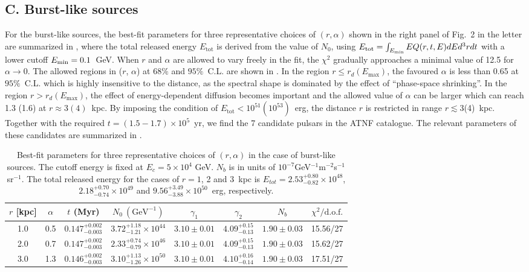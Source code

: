 \subsection{C. Burst-like sources}
For the burst-like sources, 
the best-fit parameters for three representative choices  of 
$(r, \alpha)$ shown in the right panel of Fig.~2 in the letter  %
are summarized  in  ,
where the total released energy $E_{\text{tot}}$ is derived from the value of $N_{0}$,
using
$E_{\text{tot}}=\int_{E_{\text{min}}} E Q(r,t,E) dE d^{3}r dt$ with a lower cutoff $E_{\text{min}}=0.1$~GeV.
When $r$ and $\alpha$ are allowed to vary freely in the fit, 
the $\chi^{2}$ gradually approaches a minimal value  of  12.5 for $\alpha\to 0$.
The allowed regions in ($r$, $\alpha$) at $68\%$ and $95\%$~C.L.
are shown in  .
In the region $r \leq r_{d}(E_{\text{max}})$, 
the favoured $\alpha$ is less than 0.65 at $95\%$~C.L. which is highly 
insensitive to the distance, as the spectral shape is dominated by the effect
of ``phase-space shrinking''. 
In the region $r > r_{d}(E_{\text{max}})$, the effect of energy-dependent diffusion
becomes important and the allowed value of $\alpha$ can be larger which can reach 
1.3 (1.6) at $r\approx 3 (4)$~kpc.
By imposing the condition of $E_{\text{tot}}<10^{51}(10^{53})$~erg,
the distance $r$ is restricted in range $r\lesssim 3$(4)~kpc.
Together with the required  $t=(1.5-1.7)\times 10^{5}$~yr,
we find the 7 candidate pulsars in the ATNF catalogue.
The relevant parameters of these candidates are summarized in .



\begin{table}[htbp]
	\centering
		\begin{tabular}{cc|ccccc|c}
		\hline\hline
$r$ [kpc] & $\alpha $& $t$ (Myr) & $N_0\ (\text{GeV}^{-1})$ & $\gamma_1$ & $\gamma_2$ & $N_b$  & $\chi^2/\text{d.o.f.}$ \\
		  \hline
		  1.0 & 0.5 & $0.147^{+0.002}_{-0.003}$ & $ 3.72^{+1.18}_{-1.21}\times10^{44}$  & $3.10\pm0.01$ & $4.09^{+0.15}_{-0.13}$ & $1.90\pm0.03$ & 15.56/27\\
		  2.0 & 0.7 & $0.147^{+0.002}_{-0.003}$  & $2.33^{+0.74}_{-0.79}\times10^{46}$  & $3.10\pm0.01$ & $4.09^{+0.15}_{-0.13}$ & $1.90\pm0.03$ & 15.62/27\\
		  3.0 & 1.3 & $0.146^{+0.002}_{-0.003}$  & $3.10^{+1.13}_{-1.26}\times10^{50}$  &  $3.10\pm0.01$ & $4.10^{+0.16}_{-0.14}$ & $1.90\pm0.03$ & 17.51/27\\
		\hline\hline
		\end{tabular}
	\caption{ 
	Best-fit parameters for three representative choices of $(r, \alpha)$ in the case of 
	burst-like sources. The cutoff energy is fixed at $E_c=5\times10^{4}$ GeV.
	$N_b$ is in units of $10^{-7}$GeV$^{-1}$m$^{-2}$s$^{-1}$sr$^{-1}$. 
	The total released energy for the cases of $r=1$, 2 and 3~kpc is 	
	 $ E_{tot}=2.53^{+0.80}_{-0.82}\times10^{48}$,
	 $2.18^{+0.70}_{-0.74}\times10^{49}$ and
	 $9.56^{+3.49}_{-3.88}\times10^{50}$~erg, respectively.
	}
\label{tab:SNR}
\end{table}

